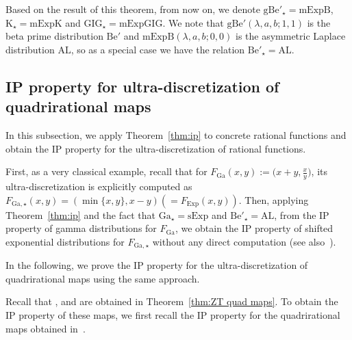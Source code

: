 \documentclass[pdftex]{sigma}
\numberwithin{equation}{section}
\newcommand{\la}{\lambda}
\def\a{{\alpha}}
\def\b{{\beta}}
\begin{document}
Based on the result of this theorem, from now on, we denote $\mathrm{gBe}'_{\star}=\mathrm{mExpB}$, $\mathrm{K}_{\star}=\mathrm{mExpK}$ and $\mathrm{GIG}_{\star}=\mathrm{mExpGIG}$. We note that $\mathrm{gBe}'(\la,a,b;1,1)$ is the beta prime distribution $\mathrm{Be}'$ and $\mathrm{mExpB}(\la,a,b;0,0)$ is the asymmetric Laplace distribution $\mathrm{AL}$, so as a special case we have the relation $\mathrm{Be}'_{\star}=\mathrm{AL}$.

\subsection{IP property for ultra-discretization of quadrirational maps}

In this subsection, we apply Theorem~\ref{thm:ip} to concrete rational functions and obtain the IP property for the ultra-discretization of rational functions.

First, as a very classical example, recall that for $F_{\mathrm{Ga}}(x,y):=\bigl(x+y, \frac{x}{y}\bigr)$, its ultra-discretization is explicitly computed as $F_{\mathrm{Ga},\star}(x,y)=(\min\{x,y\}, x-y) (=F_{\mathrm{Exp}}(x,y))$. Then, applying Theorem~\ref{thm:ip} and the fact that $\mathrm{Ga}_{\star}=\mathrm{sExp}$ and $\mathrm{Be}'_{\star}=\mathrm{AL}$, from the IP property of gamma distributions for $F_{\mathrm{Ga}}$, we obtain the IP property of shifted exponential distributions for $F_{\mathrm{Ga},\star}$ without any direct computation (see also~\cite[Proposition 5.7]{CSjsp}).

In the following, we prove the IP property for the ultra-discretization of quadrirational maps using the same approach.

Recall that
\smash{$H^{+,\a,\b}_{\mathrm{I},\star}$}, \smash{$H^{+,\a,\b}_{\mathrm{II},\star}$} and
\smash{$H^{A,\a,\b}_{\mathrm{III},\star}$} are obtained in Theorem~\ref{thm:ZT quad maps}. To obtain the IP property of these maps, we first recall the IP property for the quadrirational maps obtained in~\cite{SU}.
\end{document}
